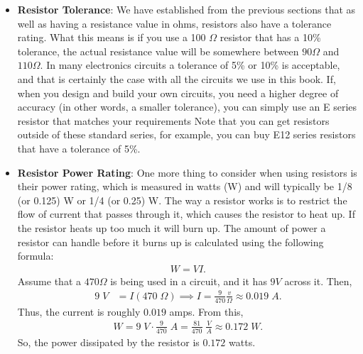 \documentclass{report}
\begin{document}
\begin{itemize}
            \bigbreak \noindent 
            \bigbreak \noindent 
            * This digit only applies to 5-band resistors.
        \item \textbf{Resistor Tolerance}: We have established from the previous sections that as well as having a resistance value in ohms, resistors also have a tolerance rating. What this means is if you use a 100 $\Omega$ resistor that has a 10\% tolerance, the actual resistance value will be somewhere between $90\Omega$ and $110 \Omega$.
            \bigbreak \noindent 
            In many electronics circuits a tolerance of 5\% or 10\% is acceptable, and that is certainly the case with all the circuits we use in this book. If, when you design and build your own circuits, you need a higher degree of accuracy (in other words, a smaller tolerance), you can simply use an E series resistor that matches your requirements
            \bigbreak \noindent 
            Note that you can get resistors outside of these standard series, for example, you can buy E12 series resistors that have a tolerance of 5\%.
        \item \textbf{Resistor Power Rating}: One more thing to consider when using resistors is their power rating, which is measured in watts (W) and will typically be 1/8 (or 0.125) W or 1/4 (or 0.25) W.
            \bigbreak \noindent 
            The way a resistor works is to restrict the flow of current that passes through it, which causes the resistor to heat up. If the resistor heats up too much it will burn up. The amount of power a resistor can handle before it burns up is calculated using the following formula:
            \begin{align*}
                W = VI
            .\end{align*}
            \bigbreak \noindent 
            Assume that a $470 \Omega$ is being used in a circuit, and it has $9 V$ across it. Then,
            \begin{align*}
                9\; V &= I(470\; \Omega) \implies I = \frac{9}{470} \frac{v}{\Omega} \approx 0.019\; A
            .\end{align*}
            Thus, the current is roughly $0.019$ amps. From this, 
            \begin{align*}
                W = 9\; V \cdot \frac{9}{470}\; A = \frac{81}{470}\; \frac{V}{A} \approx 0.172\; W
            .\end{align*}
            So, the power dissipated by the resistor is $0.172$ watts. 
            \bigbreak \noindent 

\end{itemize}
\end{document}
